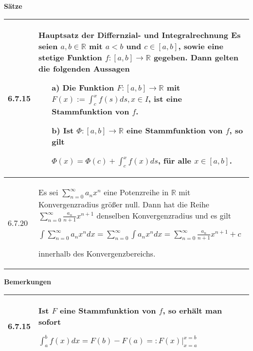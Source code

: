     \noindent 
    \textbf{Sätze}
    \begin{table}[H]
    \begin{tabularx}{\textwidth}{X m{16cm}}
        \toprule

        6.7.15& \textbf{Hauptsatz der Differnzial- und Integralrechnung} \hfill \break
                Es seien $a,b \in \mathbb{R}$ mit $a < b$ und $c \in [a,b]$, sowie eine stetige Funktion $f: [a,b] \rightarrow \mathbb{R}$
                gegeben. Dann gelten die folgenden Aussagen 
                \begin{itemize}[topsep=-0.5cm]
                    \item[a)] Die Funktion $F: [a,b] \rightarrow \mathbb{R}$ mit $F(x) := \int_c^xf(s) ds, x\in I$, ist eine Stammfunktion
                                von $f$.
                    \item[b)] Ist $\Phi : [a,b] \rightarrow \mathbb{R}$ eine Stammfunktion von $f$, so gilt \hfill \break
                                \centerline{$ \Phi(x) = \Phi(c) + \int_c^x f(x) ds$, für alle $x\in[a,b]$.}
                \end{itemize} \vspace{-0cm} \\
        \midrule
        6.7.20& Es sei $\sum^{\infty}_{n=0} a_n x^n$ eine Potenzreihe in $\mathbb{R}$ mit Konvergenzradius größer null. Dann hat die Reihe
                $\sum^{\infty}_{n=0} \frac{a_n}{n+1}x^{n+1}$ denselben Konvergenzradius und es gilt \hfill \break
                \centerline{$ \int \sum^{\infty}_{n=0} a_n x^n dx = \sum^{\infty}_{n=0} \int a_n x^n dx = \sum^{\infty}_{n=0} 
                \frac{a_n}{n+1}x^{n+1}+c $} innerhalb des Konvergenzbereichs. \\

        \bottomrule
    \end{tabularx}
    \end{table}

    \pagebreak

    \noindent
    \textbf{Bemerkungen}
    \begin{table}[H]
    \begin{tabularx}{\textwidth}{X m{16cm}}
        \toprule

        6.7.15& Ist $F$ eine Stammfunktion von $f$, so erhält man sofort \hfill \break
                \centerline{$ \int_a^bf(x) dx = F(b)-F(a) =: F(x) \vert^{x=b}_{x=a} $} \\

        \bottomrule
    \end{tabularx}
    \end{table}

